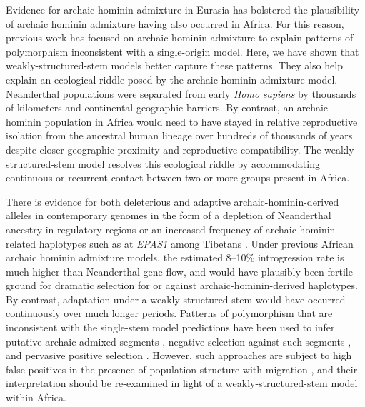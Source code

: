 \documentclass[]{article}
\begin{document}
Evidence for archaic hominin admixture in Eurasia has bolstered the plausibility of
archaic hominin admixture having also occurred in Africa. For this reason, previous
work has focused on archaic hominin admixture to explain patterns of polymorphism
inconsistent with a single-origin model. Here, we have shown that
weakly-structured-stem models better capture these patterns.
They also help explain an
ecological riddle posed by the archaic hominin admixture model. Neanderthal populations
were separated from early \emph{Homo sapiens} by thousands of kilometers and
continental geographic barriers. By contrast, an archaic hominin population in
Africa would need to have stayed in relative reproductive isolation from the
ancestral human lineage over hundreds of thousands of years despite closer geographic
proximity and reproductive compatibility. The weakly-structured-stem model
resolves this ecological riddle by accommodating continuous or recurrent
contact between two or more groups present in Africa.

There is evidence for both deleterious and adaptive archaic-hominin-derived alleles in
contemporary genomes in the form of a depletion of Neanderthal ancestry in regulatory
regions \citep{Petr2019-xo} or an increased frequency of archaic-hominin-related
haplotypes such as at \emph{EPAS1} among Tibetans \citep{Zhang2021-xx}. Under previous
African archaic hominin admixture models, the estimated 8--10\% introgression rate is
much higher than Neanderthal gene flow, and would have plausibly been fertile
ground for dramatic selection for or against archaic-hominin-derived haplotypes\citep{Wall2019-ao}. By contrast, adaptation under a weakly
structured stem would have occurred continuously over much longer periods.
Patterns of polymorphism that are inconsistent with the single-stem model
predictions have been used to infer putative archaic admixed segments
\citep{Plagnol2006-lt,Hsieh2016-gk,Wall2019-ao,Durvasula2020-td}, negative
selection against such segments \citep{Wall2019-ao}, and pervasive positive
selection \citep{Schrider2017-kl}. However, such approaches are subject to high
false positives in the presence of population structure with migration
\citep{Petr2019-xo}, and their interpretation should be re-examined in light of
a weakly-structured-stem model within Africa. 
\end{document}
